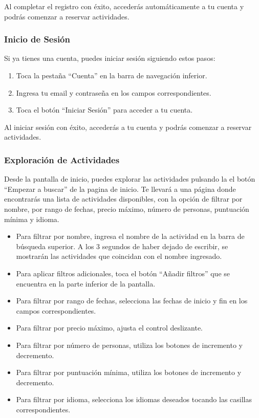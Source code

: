 Al completar el registro con éxito, accederás automáticamente a tu cuenta y podrás comenzar a reservar actividades.

\subsubsection{Inicio de Sesión}
Si ya tienes una cuenta, puedes iniciar sesión siguiendo estos pasos:

\begin{enumerate}
	\item Toca la pestaña “Cuenta” en la barra de navegación inferior.
	\item Ingresa tu email y contraseña en los campos correspondientes.
	\item Toca el botón “Iniciar Sesión” para acceder a tu cuenta.
\end{enumerate}

Al iniciar sesión con éxito, accederás a tu cuenta y podrás comenzar a reservar actividades.

\subsubsection{Exploración de Actividades}
Desde la pantalla de inicio, puedes explorar las actividades pulsando la el botón “Empezar a buscar” de la pagina de inicio. Te llevará a una página donde encontrarás una lista de actividades disponibles, con la opción de filtrar por nombre, por rango de fechas, precio máximo, número de personas, puntuación mínima y idioma.

\begin{itemize}
	\item Para filtrar por nombre, ingresa el nombre de la actividad en la barra de búsqueda superior. A los 3 segundos de haber dejado de escribir, se mostrarán las actividades que coincidan con el nombre ingresado.
	\item Para aplicar filtros adicionales, toca el botón “Añadir filtros” que se encuentra en la parte inferior de la pantalla.
	\item Para filtrar por rango de fechas, selecciona las fechas de inicio y fin en los campos correspondientes.
	\item Para filtrar por precio máximo, ajusta el control deslizante.
	\item Para filtrar por número de personas, utiliza los botones de incremento y decremento.
	\item Para filtrar por puntuación mínima, utiliza los botones de incremento y decremento.
	\item Para filtrar por idioma, selecciona los idiomas deseados tocando las casillas correspondientes.
\end{itemize}

